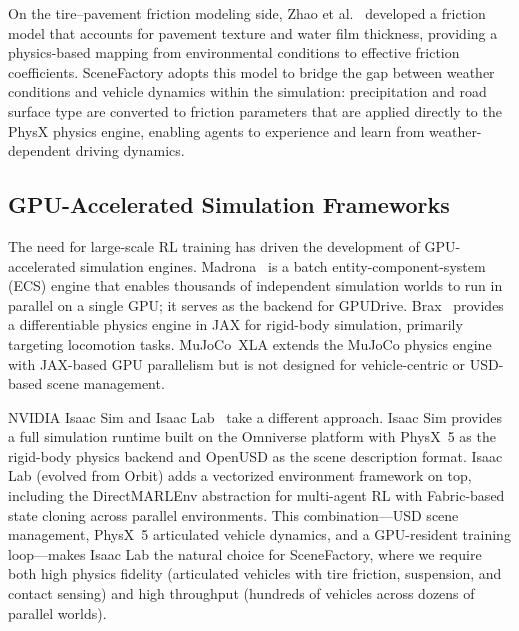 On the tire--pavement friction modeling side, Zhao et al.~\cite{zhao_tire-pavement_2024} developed a friction model that accounts for pavement texture and water film thickness, providing a physics-based mapping from environmental conditions to effective friction coefficients.
SceneFactory adopts this model to bridge the gap between weather conditions and vehicle dynamics within the simulation: precipitation and road surface type are converted to friction parameters that are applied directly to the PhysX physics engine, enabling agents to experience and learn from weather-dependent driving dynamics.

\subsection{GPU-Accelerated Simulation Frameworks}
\label{sec:rw_gpu_frameworks}

The need for large-scale RL training has driven the development of GPU-accelerated simulation engines.
Madrona~\cite{shacklett_madrona_2023} is a batch entity-component-system (ECS) engine that enables thousands of independent simulation worlds to run in parallel on a single GPU; it serves as the backend for GPUDrive.
Brax~\cite{freeman_brax_2021} provides a differentiable physics engine in JAX for rigid-body simulation, primarily targeting locomotion tasks.
MuJoCo~XLA extends the MuJoCo physics engine with JAX-based GPU parallelism but is not designed for vehicle-centric or USD-based scene management.

NVIDIA Isaac Sim and Isaac Lab~\cite{nvidia_isaac_2025, mittal_orbit_2023} take a different approach.
Isaac Sim provides a full simulation runtime built on the Omniverse platform with PhysX~5 as the rigid-body physics backend and OpenUSD as the scene description format.
Isaac Lab (evolved from Orbit) adds a vectorized environment framework on top, including the DirectMARLEnv abstraction for multi-agent RL with Fabric-based state cloning across parallel environments.
This combination—USD scene management, PhysX~5 articulated vehicle dynamics, and a GPU-resident training loop—makes Isaac Lab the natural choice for SceneFactory, where we require both high physics fidelity (articulated vehicles with tire friction, suspension, and contact sensing) and high throughput (hundreds of vehicles across dozens of parallel worlds).

